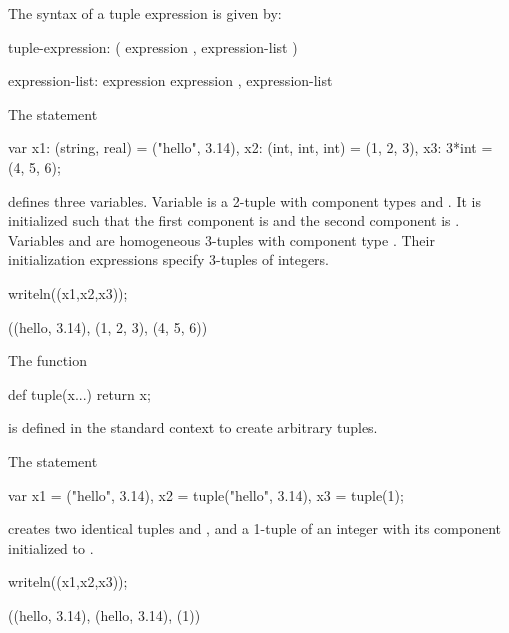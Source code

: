 The syntax of a tuple expression is given by:
\begin{syntax}
tuple-expression:
  ( expression , expression-list )

expression-list:
  expression
  expression , expression-list
\end{syntax}

\begin{example}
\begin{chapelpre}
\end{chapelpre}
The statement
\begin{chapel}
var x1: (string, real) = ("hello", 3.14),
    x2: (int, int, int) = (1, 2, 3),
    x3: 3*int = (4, 5, 6);
\end{chapel}
defines three variables.  Variable  is a 2-tuple with
component types  and .  It is initialized such
that the first component is  and the second
component is .  Variables  and  are
homogeneous 3-tuples with component type .  Their
initialization expressions specify 3-tuples of integers.
\begin{chapelpost}
writeln((x1,x2,x3));
\end{chapelpost}
\begin{chapeloutput}
((hello, 3.14), (1, 2, 3), (4, 5, 6))
\end{chapeloutput}
\end{example}

The function
\begin{chapel}
def tuple(x...) return x;
\end{chapel}
is defined in the standard context to create arbitrary tuples.

\begin{example}
\begin{chapelpre}
\end{chapelpre}
The statement
\begin{chapel}
var x1 =      ("hello", 3.14),
    x2 = tuple("hello", 3.14),
    x3 = tuple(1);
\end{chapel}
creates two identical tuples  and , and a 1-tuple of
an integer  with its component initialized to .
\begin{chapelpost}
writeln((x1,x2,x3));
\end{chapelpost}
\begin{chapeloutput}
((hello, 3.14), (hello, 3.14), (1))
\end{chapeloutput}
\end{example}

